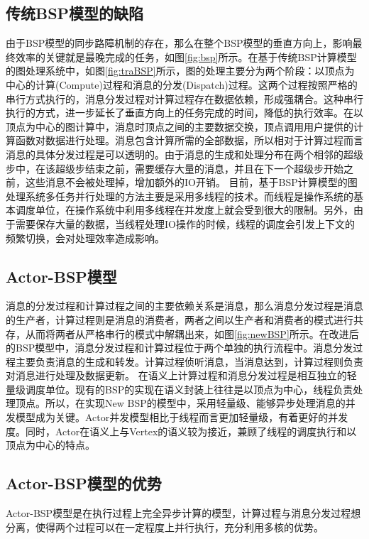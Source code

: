 \subsection{传统BSP模型的缺陷}
由于BSP模型的同步路障机制的存在，那么在整个BSP模型的垂直方向上，影响最终效率的关键就是最晚完成的任务，如图\ref{fig:bsp}所示。在基于传统BSP计算模型的图处理系统中，如图\ref{fig:traBSP}所示，图的处理主要分为两个阶段：以顶点为中心的计算(Compute)过程和消息的分发(Dispatch)过程。这两个过程按照严格的串行方式执行的，消息分发过程对计算过程存在数据依赖，形成强耦合。这种串行执行的方式，进一步延长了垂直方向上的任务完成的时间，降低的执行效率。在以顶点为中心的图计算中，消息时顶点之间的主要数据交换，顶点调用用户提供的计算函数对数据进行处理。消息包含计算所需的全部数据，所以相对于计算过程而言消息的具体分发过程是可以透明的。由于消息的生成和处理分布在两个相邻的超级步中，在该超级步结束之前，需要缓存大量的消息，并且在下一个超级步开始之前，这些消息不会被处理掉，增加额外的IO开销。
目前，基于BSP计算模型的图处理系统多任务并行处理的方法主要是采用多线程的技术。而线程是操作系统的基本调度单位，在操作系统中利用多线程在并发度上就会受到很大的限制。另外，由于需要保存大量的数据，当线程处理IO操作的时候，线程的调度会引发上下文的频繁切换，会对处理效率造成影响。

\subsection{Actor-BSP模型}

消息的分发过程和计算过程之间的主要依赖关系是消息，那么消息分发过程是消息的生产者，计算过程则是消息的消费者，两者之间以生产者和消费者的模式进行共存，从而将两者从严格串行的模式中解耦出来，如图\ref{fig:newBSP}所示。在改进后的BSP模型中，消息分发过程和计算过程位于两个单独的执行流程中。消息分发过程主要负责消息的生成和转发。计算过程侦听消息，当消息达到，计算过程则负责对消息进行处理及数据更新。
在语义上计算过程和消息分发过程是相互独立的轻量级调度单位。现有的BSP的实现在语义封装上往往是以顶点为中心，线程负责处理顶点。所以，在实现New BSP的模型中，采用轻量级、能够异步处理消息的并发模型成为关键。Actor并发模型相比于线程而言更加轻量级，有着更好的并发度。同时，Actor在语义上与Vertex的语义较为接近，兼顾了线程的调度执行和以顶点为中心的特点。

\subsection{Actor-BSP模型的优势}

Actor-BSP模型是在执行过程上完全异步计算的模型，计算过程与消息分发过程想分离，使得两个过程可以在一定程度上并行执行，充分利用多核的优势。

